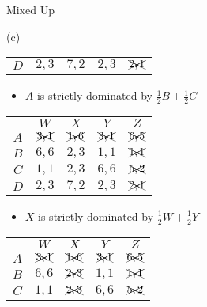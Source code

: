 \documentclass[8pt]{extarticle}
\begin{document}
\begin{problem}{Mixed Up}
\begin{problem}{(c)}
\begin{center}
\begin{tabular}{c|c|c|c|c|}
          \cline{2-5}
          $D$ & $2,3$ & $7,2$ & $2,3$ & $\xcancel{2,1}$\\
          \cline{2-5}
        \end{tabular}
      \end{center}
        \begin{itemize}
          \item $A$ is strictly dominated by $\frac{1}{2}B + \frac{1}{2}C$
        \end{itemize}
        \begin{center}
          \small
          \renewcommand{\arraystretch}{1.5}
          \begin{tabular}{c|c|c|c|c|}
            \multicolumn{1}{c}{} & \multicolumn{1}{c}{$W$} & \multicolumn{1}{c}{$X$} & \multicolumn{1}{c}{$Y$} & \multicolumn{1}{c}{$Z$}\\
            \cline{2-5}
            $A$ & $\xcancel{3,1}$ & $\xcancel{1,6}$ & $\xcancel{3,1}$ & $\xcancel{6,5}$ \\
            \cline{2-5}
            $B$ & $6,6$ & $2,3$ & $1,1$ & $\xcancel{1,1}$ \\
            \cline{2-5}
            $C$ & $1,1$ & $2,3$ & $6,6$ & $\xcancel{5,2}$ \\
            \cline{2-5}
            $D$ & $2,3$ & $7,2$ & $2,3$ & $\xcancel{2,1}$\\
            \cline{2-5}
          \end{tabular}
        \end{center}
        \begin{itemize}
          \item $X$ is strictly dominated by $\frac{1}{2}W + \frac{1}{2}Y$
        \end{itemize}
        \begin{center}
          \small
          \renewcommand{\arraystretch}{1.5}
          \begin{tabular}{c|c|c|c|c|}
            \multicolumn{1}{c}{} & \multicolumn{1}{c}{$W$} & \multicolumn{1}{c}{$X$} & \multicolumn{1}{c}{$Y$} & \multicolumn{1}{c}{$Z$}\\
            \cline{2-5}
            $A$ & $\xcancel{3,1}$ & $\xcancel{1,6}$ & $\xcancel{3,1}$ & $\xcancel{6,5}$ \\
            \cline{2-5}
            $B$ & $6,6$ & $\xcancel{2,3}$ & $1,1$ & $\xcancel{1,1}$ \\
            \cline{2-5}
            $C$ & $1,1$ & $\xcancel{2,3}$ & $6,6$ & $\xcancel{5,2}$ \\

\end{tabular}
\end{center}
\end{problem}
\end{problem}
\end{document}
